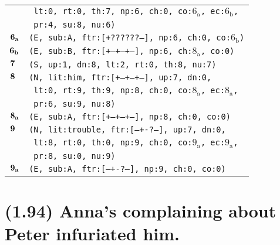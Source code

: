 \documentclass{article}
\begin{document}
\begin{minipage}{\textwidth}
{\begin{tabular}{|r|l|}
    & \texttt{\texttt{~lt:0,~rt:0,~th:7,~np:6,~ch:0,~co:${\textrm{6}_{\textrm{a}}}$,~ec:${\textrm{6}_{\textrm{b}}}$,}} \\
    & \texttt{\texttt{~pr:4,~su:8,~nu:6)}} \\
    ${\textbf{\textrm{6}}_{\textbf{\textrm{a}}}}$ & \texttt{\texttt{(E,~sub:A,~ftr:[+??????--],~np:6,~ch:0,~co:${\textrm{6}_{\textrm{b}}}$)}} \\
    ${\textbf{\textrm{6}}_{\textbf{\textrm{b}}}}$ & \texttt{\texttt{(E,~sub:B,~ftr:[+--+--+--],~np:6,~ch:${\textrm{8}_{\textrm{a}}}$,~co:0)}} \\
    ${\textbf{\textrm{7}}_{\phantom{z}}}$ & \texttt{\texttt{(S,~up:1,~dn:8,~lt:2,~rt:0,~th:8,~nu:7)}} \\
    ${\textbf{\textrm{8}}_{\phantom{z}}}$ & \texttt{\texttt{(N,~lit:him,~ftr:[+--+--+--],~up:7,~dn:0,}} \\
    & \texttt{\texttt{~lt:0,~rt:9,~th:9,~np:8,~ch:0,~co:${\textrm{8}_{\textrm{a}}}$,~ec:${\textrm{8}_{\textrm{a}}}$,}} \\
    & \texttt{\texttt{~pr:6,~su:9,~nu:8)}} \\
    ${\textbf{\textrm{8}}_{\textbf{\textrm{a}}}}$ & \texttt{\texttt{(E,~sub:A,~ftr:[+--+--+--],~np:8,~ch:0,~co:0)}} \\
    ${\textbf{\textrm{9}}_{\phantom{z}}}$ & \texttt{\texttt{(N,~lit:trouble,~ftr:[---+-?---],~up:7,~dn:0,}} \\
    & \texttt{\texttt{~lt:8,~rt:0,~th:0,~np:9,~ch:0,~co:${\textrm{9}_{\textrm{a}}}$,~ec:${\textrm{9}_{\textrm{a}}}$,}} \\
    & \texttt{\texttt{~pr:8,~su:0,~nu:9)}} \\
    ${\textbf{\textrm{9}}_{\textbf{\textrm{a}}}}$ & \texttt{\texttt{(E,~sub:A,~ftr:[---+-?---],~np:9,~ch:0,~co:0)}} \\
    \hline
  \end{tabular}
  }
\end{minipage}
\bigbreak

\clearpage

%
%

\section*{(1.94) Anna's complaining about Peter infuriated him.}
\end{document}
